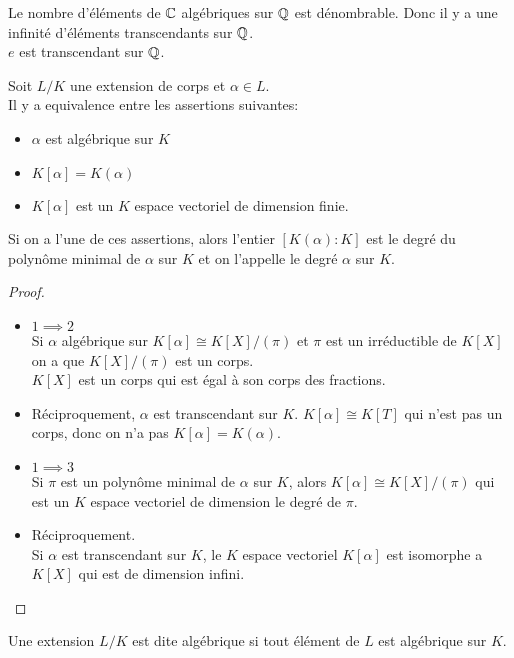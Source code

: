 \begin{remarque}
	Le nombre d'éléments de $\mathbb{C}$ algébriques sur $\mathbb{Q}$ est dénombrable. Donc il y a une infinité d'éléments transcendants sur $\mathbb{Q}$.\\
	$e$ est transcendant sur $\mathbb{Q}$.
\end{remarque}


\begin{prop}
	Soit $L/K$ une extension de corps et $\alpha \in L$.\\
	Il y a equivalence entre les assertions suivantes:
	\begin{itemize}
		\item  $\alpha$ est algébrique sur $K$
		\item $K[\alpha] = K(\alpha)$
		\item $K[\alpha]$ est un $K$ espace vectoriel de dimension finie.
	\end{itemize}
	Si on a l'une de ces assertions, alors l'entier $[K(\alpha) : K]$ est le degré du polynôme minimal de $\alpha$ sur $K$ et on l'appelle le degré $\alpha$ sur $K$.
\end{prop}

\begin{proof}
	\begin{itemize}
		\item $1 \implies 2$\\
		      Si $\alpha$ algébrique sur $K[\alpha] \cong K[X]/(\pi)$ et $\pi$ est un irréductible de $K[X]$ on a que $K[X]/(\pi)$ est un corps.\\
		      $K[X]$ est un corps qui est égal à son corps des fractions.
		\item Réciproquement, $\alpha$ est transcendant sur $K$.
		      $K[\alpha] \cong K[T]$ qui n'est pas un corps, donc on n'a pas $K[\alpha] = K(\alpha)$.
		\item $1 \implies 3$\\
		      Si $\pi$ est un polynôme minimal de $\alpha$ sur $K$, alors $K[\alpha] \cong K[X]/(\pi)$ qui est un $K$ espace vectoriel de dimension le degré de $\pi$.
		\item Réciproquement. \\
		      Si $\alpha$ est transcendant sur $K$, le $K$ espace vectoriel $K[\alpha]$ est isomorphe a $K[X]$ qui est de dimension infini.
	\end{itemize}
\end{proof}

\begin{definition}
	Une extension $L/K$ est dite algébrique si tout élément de $L$ est algébrique sur $K$.\\
\end{definition}

